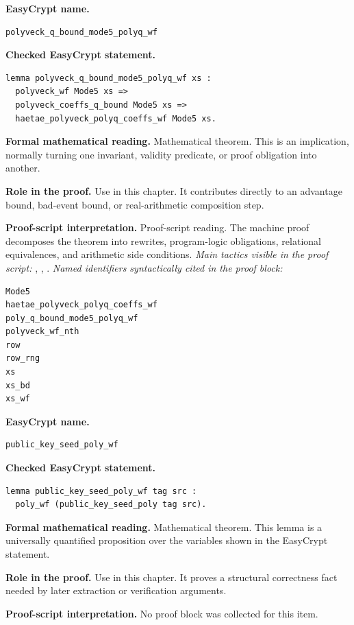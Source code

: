 \begin{formaltheorem}
\noindent\textbf{EasyCrypt name.}
\begin{lstlisting}[language=EasyCrypt,basicstyle=\ttfamily\scriptsize]
polyveck_q_bound_mode5_polyq_wf
\end{lstlisting}
\noindent\textbf{Checked EasyCrypt statement.}
\begin{lstlisting}[language=EasyCrypt,basicstyle=\ttfamily\scriptsize]
lemma polyveck_q_bound_mode5_polyq_wf xs :
  polyveck_wf Mode5 xs =>
  polyveck_coeffs_q_bound Mode5 xs =>
  haetae_polyveck_polyq_coeffs_wf Mode5 xs.
\end{lstlisting}
\noindent\textbf{Formal mathematical reading.}
Mathematical theorem. This is an implication, normally turning one invariant, validity predicate, or proof obligation into another.

\noindent\textbf{Role in the proof.}
Use in this chapter. It contributes directly to an advantage bound, bad-event bound, or real-arithmetic composition step.

\noindent\textbf{Proof-script interpretation.}
Proof-script reading. The machine proof decomposes the theorem into rewrites, program-logic obligations, relational equivalences, and arithmetic side conditions.
\emph{Main tactics visible in the proof script:} , , .
\emph{Named identifiers syntactically cited in the proof block:}
\begin{lstlisting}[language=EasyCrypt,basicstyle=\ttfamily\scriptsize]
Mode5
haetae_polyveck_polyq_coeffs_wf
poly_q_bound_mode5_polyq_wf
polyveck_wf_nth
row
row_rng
xs
xs_bd
xs_wf
\end{lstlisting}

\end{formaltheorem}

\begin{formaltheorem}
\noindent\textbf{EasyCrypt name.}
\begin{lstlisting}[language=EasyCrypt,basicstyle=\ttfamily\scriptsize]
public_key_seed_poly_wf
\end{lstlisting}
\noindent\textbf{Checked EasyCrypt statement.}
\begin{lstlisting}[language=EasyCrypt,basicstyle=\ttfamily\scriptsize]
lemma public_key_seed_poly_wf tag src :
  poly_wf (public_key_seed_poly tag src).
\end{lstlisting}
\noindent\textbf{Formal mathematical reading.}
Mathematical theorem. This lemma is a universally quantified proposition over the variables shown in the EasyCrypt statement.

\noindent\textbf{Role in the proof.}
Use in this chapter. It proves a structural correctness fact needed by later extraction or verification arguments.

\noindent\textbf{Proof-script interpretation.}
No proof block was collected for this item.

\end{formaltheorem}

